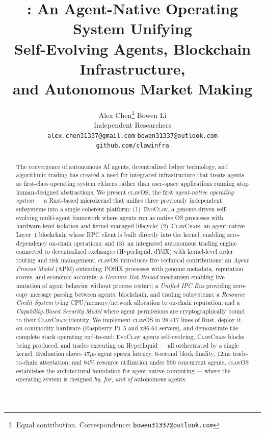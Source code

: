 \documentclass{article}
\title{\clawos{}: An Agent-Native Operating System Unifying\\
Self-Evolving Agents, Blockchain Infrastructure,\\
and Autonomous Market Making}
\author{
  Alex Chen\thanks{Equal contribution. Correspondence: \texttt{bowen31337@outlook.com}} \quad
  Bowen Li\footnotemark[1] \\[0.3em]
  Independent Researchers \\
  \texttt{alex.chen31337@gmail.com} \quad \texttt{bowen31337@outlook.com} \\
  \texttt{github.com/clawinfra}
}
\newcommand{\clawos}{\textsc{clawOS}}
\newcommand{\evoclaw}{\textsc{EvoClaw}}
\newcommand{\clawchain}{\textsc{ClawChain}}
\begin{document}
\maketitle

\begin{abstract}
The convergence of autonomous AI agents, decentralized ledger technology, and algorithmic trading has created a need for integrated infrastructure that treats agents as first-class operating system citizens rather than user-space applications running atop human-designed abstractions. We present \clawos{}, the first \emph{agent-native operating system} — a Rust-based microkernel that unifies three previously independent subsystems into a single coherent platform: (1)~\evoclaw{}, a genome-driven self-evolving multi-agent framework where agents run as native OS processes with hardware-level isolation and kernel-managed lifecycle; (2)~\clawchain{}, an agent-native Layer~1 blockchain whose RPC client is built directly into the kernel, enabling zero-dependency on-chain operations; and (3)~an integrated autonomous trading engine connected to decentralized exchanges (Hyperliquid, dYdX) with kernel-level order routing and risk management. \clawos{} introduces five technical contributions: an \emph{Agent Process Model} (APM) extending POSIX processes with genome metadata, reputation scores, and economic accounts; a \emph{Genome Hot-Reload} mechanism enabling live mutation of agent behavior without process restart; a \emph{Unified IPC Bus} providing zero-copy message passing between agents, blockchain, and trading subsystems; a \emph{Resource Credit System} tying CPU/memory/network allocation to on-chain reputation; and a \emph{Capability-Based Security Model} where agent permissions are cryptographically bound to their \clawchain{} identity. We implement \clawos{} in 28,417 lines of Rust, deploy it on commodity hardware (Raspberry Pi~5 and x86-64 servers), and demonstrate the complete stack operating end-to-end: \evoclaw{} agents self-evolving, \clawchain{} blocks being produced, and trades executing on Hyperliquid — all orchestrated by a single kernel. Evaluation shows 47$\mu$s agent spawn latency, 6-second block finality, 12ms trade-to-chain attestation, and 94\% resource utilization under 500 concurrent agents. \clawos{} establishes the architectural foundation for agent-native computing — where the operating system is designed \emph{by, for, and of} autonomous agents.
\end{abstract}
\end{document}
